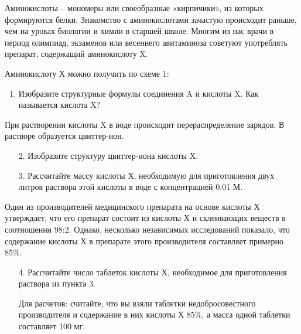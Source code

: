 
Аминокислоты – мономеры или своеобразные «кирпичики», из которых формируются белки. Знакомство с 
аминокислотами зачастую происходит раньше, чем на уроках биологии и химии в старшей школе. Многим 
из нас врачи в период олимпиад, экзаменов или весеннего авитаминоза советуют употреблять препарат, 
содержащий аминокислоту X. 

Аминокислоту Х можно получить по схеме 1:

\begin{enumerate}
    \item Изобразите структурные формулы соединения A и кислоты X. Как называется кислота X?
\end{enumerate} 

При растворении кислоты X в воде происходит перераспределение зарядов. В растворе образуется цвиттер-ион.
    
\begin{enumerate}    
    \item[2.] Изобразите структуру цвиттер-иона кислоты X.
    \item[3.] Рассчитайте массу кислоты Х, необходимую для приготовления двух литров раствора этой кислоты в воде с концентрацией 0.01 М.
\end{enumerate}    

Один из производителей медицинского препарата на основе кислоты Х утверждает, что его препарат состоит из кислоты Х и склеивающих веществ в соотношении 98:2. Однако, несколько независимых исследований показало, что содержание кислоты Х в препарате этого производителя составляет примерно 85\%.
    
\begin{enumerate}
    \item[4.] Рассчитайте число таблеток кислоты Х, необходимое для приготовления раствора из пункта 3. 

    Для расчетов: считайте, что вы взяли таблетки недобросовестного производителя и содержание в них кислоты Х 85\%, а масса одной таблетки составляет 100 мг.
\end{enumerate}